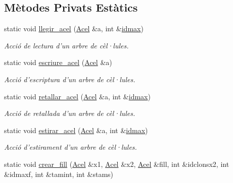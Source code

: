 \subsection*{Mètodes Privats Estàtics}
\begin{DoxyCompactItemize}
\item 
static void \hyperlink{class_organisme_a06ba17d1b6850dd79d743cbe6bca429f}{llegir\-\_\-acel} (\hyperlink{class_organisme_a6322ecf5313caa7df794a33c4fc58f4e}{Acel} \&a, int \&\hyperlink{class_organisme_a09a3d9937c91142b69b8d682c5804f37}{idmax})
\begin{DoxyCompactList}\small\item\em Acció de lectura d'un arbre de cèl·lules. \end{DoxyCompactList}\item 
static void \hyperlink{class_organisme_a18593921b9bf3ca9730ea8125c550b3c}{escriure\-\_\-acel} (\hyperlink{class_organisme_a6322ecf5313caa7df794a33c4fc58f4e}{Acel} \&a)
\begin{DoxyCompactList}\small\item\em Acció d'escriptura d'un arbre de cèl·lules. \end{DoxyCompactList}\item 
static void \hyperlink{class_organisme_a936b89cb20fc7d638d9b232828cf1e49}{retallar\-\_\-acel} (\hyperlink{class_organisme_a6322ecf5313caa7df794a33c4fc58f4e}{Acel} \&a, int \&\hyperlink{class_organisme_a09a3d9937c91142b69b8d682c5804f37}{idmax})
\begin{DoxyCompactList}\small\item\em Acció de retallada d'un arbre de cèl·lules. \end{DoxyCompactList}\item 
static void \hyperlink{class_organisme_a368d38216a2768978f4b8c2123b84aa1}{estirar\-\_\-acel} (\hyperlink{class_organisme_a6322ecf5313caa7df794a33c4fc58f4e}{Acel} \&a, int \&\hyperlink{class_organisme_a09a3d9937c91142b69b8d682c5804f37}{idmax})
\begin{DoxyCompactList}\small\item\em Acció d'estirament d'un arbre de cèl·lules. \end{DoxyCompactList}\item 
static void \hyperlink{class_organisme_a8b9eaa46043031bbc5cb0c4aa3226b66}{crear\-\_\-fill} (\hyperlink{class_organisme_a6322ecf5313caa7df794a33c4fc58f4e}{Acel} \&x1, \hyperlink{class_organisme_a6322ecf5313caa7df794a33c4fc58f4e}{Acel} \&x2, \hyperlink{class_organisme_a6322ecf5313caa7df794a33c4fc58f4e}{Acel} \&fill, int \&idclonsx2, int \&idmaxf, int \&tamint, int \&stams)

\end{DoxyCompactItemize}
